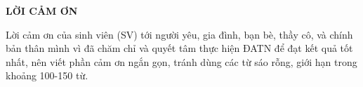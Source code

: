 \documentclass[../DoAn.tex]{subfiles}
\begin{document}
\begin{center}
    \Large{\textbf{LỜI CẢM ƠN}}\\
\end{center}
\vspace{1cm}
Lời cảm ơn của sinh viên (SV) tới người yêu, gia đình, bạn bè, thầy cô, và chính bản thân mình vì đã chăm chỉ và quyết tâm thực hiện ĐATN để đạt kết quả tốt nhất, nên viết phần cảm ơn ngắn gọn, tránh dùng các từ sáo rỗng, giới hạn trong khoảng 100-150 từ.
\end{document}
